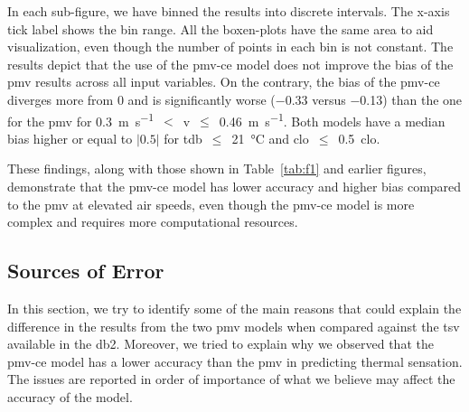 In each sub-figure, we have binned the results into discrete intervals.
The x-axis tick label shows the bin range.
All the boxen-plots have the same area to aid visualization, even though the number of points in each bin is not constant.
The results depict that the use of the \ac{pmv-ce} model does not improve the bias of the \ac{pmv} results across all input variables.
On the contrary, the bias of the \ac{pmv-ce} diverges more from 0 and is significantly worse (\num{-.33} versus \num{-0.13}) than the one for the \ac{pmv} for \qty{0.3}{\m\per\s}~$<$~\ac{v}~$\leq$~\qty{0.46}{\m\per\s}.
Both models have a median bias higher or equal to $\lvert0.5\lvert$ for \ac{tdb}~$\leq$~\qty{21}{\celsius} and \ac{clo}~$\leq$~\qty{.5}{clo}.

These findings, along with those shown in Table~\ref{tab:f1} and earlier figures, demonstrate that the \ac{pmv-ce} model has lower accuracy and higher bias compared to the \ac{pmv} at elevated air speeds, even though the \ac{pmv-ce} model is more complex and requires more computational resources.

\subsection{Sources of Error}\label{subsec:sources-of-error}
In this section, we try to identify some of the main reasons that could explain the difference in the results from the two \ac{pmv} models when compared against the \ac{tsv} available in the \ac{db2}.
Moreover, we tried to explain why we observed that the \ac{pmv-ce} model has a lower accuracy than the \ac{pmv} in predicting thermal sensation.
The issues are reported in order of importance of what we believe may affect the accuracy of the model.

